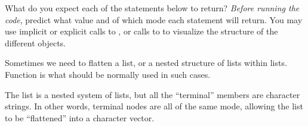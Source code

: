 \documentclass[krantz2]{krantz}\usepackage{knitr}
\begin{document}
\begin{playground}
What do you expect each of the statements below to return? \emph{Before running the code}, predict what value and of which mode each statement will return. You may use implicit or explicit calls to , or calls to  to visualize the structure of the different objects.

\begin{knitrout}\footnotesize
{}\color{fgcolor}\begin{kframe}
\begin{alltt}
 \hlkwb{<-} \hlstd{(} \hlstd{=} \hlstd{(}\hlstd{,} \hlstd{,} \hlstd{),}  \hlstd{=} \hlstd{(}\hlstd{,} \hlstd{))}
\hlstd{nested.list[}\hlopt{:}\hlstd{]}
\hlstd{nested.list[}\hlstd{]}
\hlstd{nested.list[[}\hlstd{]][}\hlstd{]}
\hlstd{nested.list[[}\hlstd{]][[}\hlstd{]]}
\hlstd{nested.list[}\hlstd{]}
\hlstd{nested.list[}\hlstd{][[}\hlstd{]]}
\end{alltt}
\end{kframe}
\end{knitrout}

\end{playground}

Sometimes we need to flatten a list, or a nested structure of lists within lists. Function  is what should be normally used in such cases.

The list  is a nested system of lists, but all the ``terminal'' members are character strings. In other words, terminal nodes are all of the same mode, allowing the list to be ``flattened'' into a character vector.
\end{document}
